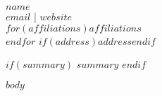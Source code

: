 \documentclass[11pt]{article}
\begin{document}
\begin{center}
  {\Huge\bfseries $name$}\\[0.5ex]
  \href{mailto:$email$}{$email$} \;|\; \href{$website$}{$website$}\\[0.8ex]
  $for(affiliations)$\relax $affiliations$\\$endfor$
  $if(address)$\relax $address$$endif$
\end{center}

$if(summary)$
\vspace{0.8ex}
$summary$
$endif$

$body$
\end{document}
